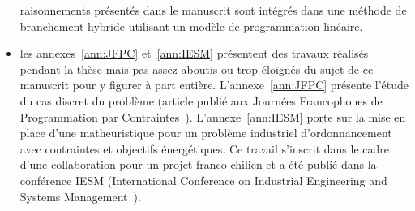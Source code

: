 \begin{itemize}
raisonnements présentés dans le manuscrit sont intégrés dans une
méthode de branchement hybride utilisant un modèle de programmation
linéaire.
\item les annexes~\ref{ann:JFPC} et~\ref{ann:IESM} présentent des
  travaux réalisés pendant la thèse mais pas assez aboutis ou trop
  éloignés du sujet de ce manuscrit pour y figurer à part entière.
  L'annexe~\ref{ann:JFPC} présente l'étude du cas discret du problème
  (article publié aux Journées Francophones de Programmation par
  Contraintes~\cite{Nattaf_JFPC}). L'annexe~\ref{ann:IESM} porte sur
  la mise en place d'une matheuristique pour un problème industriel
  d'ordonnancement avec contraintes et objectifs énergétiques. Ce
  travail s'inscrit dans le cadre d'une collaboration pour un projet
  franco-chilien et a été publié dans la conférence IESM (International
  Conference on Industrial Engineering and Systems
  Management~\cite{Nattaf_IESM}). 
\end{itemize}










